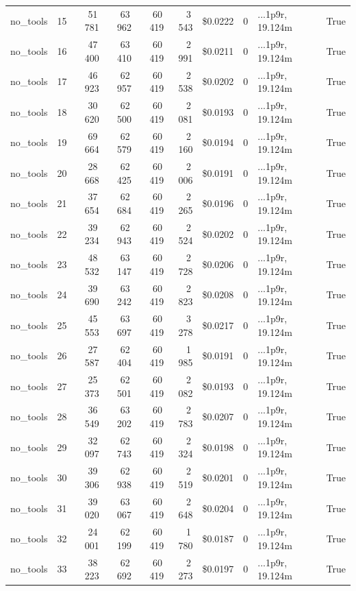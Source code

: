 \documentclass[a4paper,11pt]{article}
\begin{document}
\begin{table}[H]
{\begin{tabular}{l r r r r r r r l r}
no\_tools & 15 & 51\,781 & 63\,962 & 60\,419 & 3\,543 & \$0.0222 & 0 & ...1p9r, 19.124m & True \\
no\_tools & 16 & 47\,400 & 63\,410 & 60\,419 & 2\,991 & \$0.0211 & 0 & ...1p9r, 19.124m & True \\
no\_tools & 17 & 46\,923 & 62\,957 & 60\,419 & 2\,538 & \$0.0202 & 0 & ...1p9r, 19.124m & True \\
no\_tools & 18 & 30\,620 & 62\,500 & 60\,419 & 2\,081 & \$0.0193 & 0 & ...1p9r, 19.124m & True \\
no\_tools & 19 & 69\,664 & 62\,579 & 60\,419 & 2\,160 & \$0.0194 & 0 & ...1p9r, 19.124m & True \\
no\_tools & 20 & 28\,668 & 62\,425 & 60\,419 & 2\,006 & \$0.0191 & 0 & ...1p9r, 19.124m & True \\
no\_tools & 21 & 37\,654 & 62\,684 & 60\,419 & 2\,265 & \$0.0196 & 0 & ...1p9r, 19.124m & True \\
no\_tools & 22 & 39\,234 & 62\,943 & 60\,419 & 2\,524 & \$0.0202 & 0 & ...1p9r, 19.124m & True \\
no\_tools & 23 & 48\,532 & 63\,147 & 60\,419 & 2\,728 & \$0.0206 & 0 & ...1p9r, 19.124m & True \\
no\_tools & 24 & 39\,690 & 63\,242 & 60\,419 & 2\,823 & \$0.0208 & 0 & ...1p9r, 19.124m & True \\
no\_tools & 25 & 45\,553 & 63\,697 & 60\,419 & 3\,278 & \$0.0217 & 0 & ...1p9r, 19.124m & True \\
no\_tools & 26 & 27\,587 & 62\,404 & 60\,419 & 1\,985 & \$0.0191 & 0 & ...1p9r, 19.124m & True \\
no\_tools & 27 & 25\,373 & 62\,501 & 60\,419 & 2\,082 & \$0.0193 & 0 & ...1p9r, 19.124m & True \\
no\_tools & 28 & 36\,549 & 63\,202 & 60\,419 & 2\,783 & \$0.0207 & 0 & ...1p9r, 19.124m & True \\
no\_tools & 29 & 32\,097 & 62\,743 & 60\,419 & 2\,324 & \$0.0198 & 0 & ...1p9r, 19.124m & True \\
no\_tools & 30 & 39\,306 & 62\,938 & 60\,419 & 2\,519 & \$0.0201 & 0 & ...1p9r, 19.124m & True \\
no\_tools & 31 & 39\,020 & 63\,067 & 60\,419 & 2\,648 & \$0.0204 & 0 & ...1p9r, 19.124m & True \\
no\_tools & 32 & 24\,001 & 62\,199 & 60\,419 & 1\,780 & \$0.0187 & 0 & ...1p9r, 19.124m & True \\
no\_tools & 33 & 38\,223 & 62\,692 & 60\,419 & 2\,273 & \$0.0197 & 0 & ...1p9r, 19.124m & True \\

\end{tabular}}
\end{table}
\end{document}
